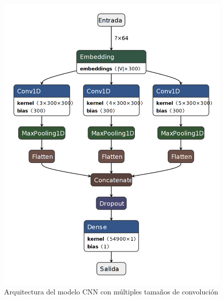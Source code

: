 \begin{figure}[!h]
    \centering
  \includegraphics[scale=0.3]{sections/figures/cnn_model.png}
    \caption{Arquitectura del modelo CNN con múltiples tamaños de convolución}
    \label{fig:cnn_model}
\end{figure}
